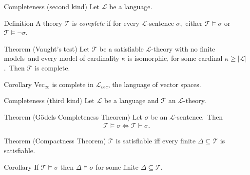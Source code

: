 \documentclass{beamer}
\DeclareMathOperator{\proves}{\vdash}
\begin{document}
\begin{frame}{Completeness (second kind)}
	Let $\mathcal{L}$ be a language.\\
	\pause
		
	\begin{block}{Definition}
		A theory $\mathcal{T}$ is \textit{complete} if for every $\mathcal{L}$-sentence $\sigma$,\pause\ either $\mathcal{T}\models\sigma$ or $\mathcal{T}\models\lnot\sigma$.
	\end{block}
	
	\pause
	
	\begin{block}{Theorem (Vaught's test)}
		Let $\mathcal{T}$ be a satisfiable $\mathcal{L}$-theory with no finite models\pause\ and every model of cardinality $\kappa$ is isomorphic, for some cardinal $\kappa\geq|\mathcal{L}|$.\pause\ Then $\mathcal{T}$ is complete.
	\end{block}
	
	\pause
	
	\begin{block}{Corollary}
		\textsf{Vec}$_\infty$ is complete in $\mathcal{L}_{vec}$, the language of vector spaces.
	\end{block}
\end{frame}


\begin{frame}{Completeness (third kind)}
	Let $\mathcal{L}$ be a language and $\mathcal{T}$ an $\mathcal{L}$-theory.\\
	
	\pause
	
	\begin{block}{Theorem (Gödels Completeness Theorem)}
		Let $\sigma$ be an $\mathcal{L}$-sentence.\pause\ Then
		\begin{align*}
			\mathcal{T}\models\sigma\Leftrightarrow\mathcal{T}\proves\sigma.
		\end{align*}
	\end{block}
	
	\pause
	
	\begin{block}{Theorem (Compactness Theorem)}
		$\mathcal{T}$ is satisfiable iff every finite $\Delta\subseteq\mathcal{T}$ is satisfiable.
	\end{block}
	
	\pause
	
	\begin{block}{Corollary}
		If $\mathcal{T}\models\sigma$ then $\Delta\models\sigma$ for some finite $\Delta\subseteq\mathcal{T}$.
	\end{block}
\end{frame}
\end{document}
